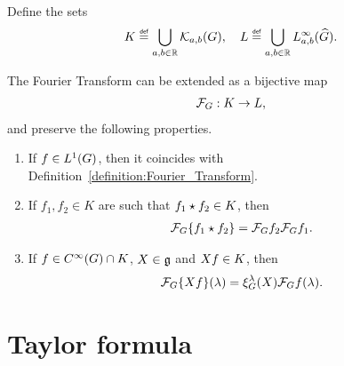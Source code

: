 \begin{proposition}
    Define the sets
    \begin{align*}
        K \defeq \bigcup_{a, b \in \R} \KernelsSobolev{a}{b}, \quad
        L \defeq \bigcup_{a, b \in \R} \LebesgueDual[a, b]{\infty}{\Group}.
    \end{align*}

    The Fourier Transform can be extended as a bijective map
    \begin{align*}
        \mathcal{F}_{G} : K \to L,
    \end{align*}
    and preserve the following properties.
    \begin{enumerate}
        \item If $f \in {L^{1} (G)}$, then it coincides with Definition~\ref{definition:Fourier_Transform}.
        \item If $f_1, f_2 \in K$ are such that $f_1 \star f_2 \in K$, then
            \begin{align*}
                \mathcal{F}_{G}\{f_1 \star f_2\} = \mathcal{F}_{G} f_2 \mathcal{F}_{G} f_1.
            \end{align*}
        \item If $f \in {C^\infty(G)} \cap K$, $X \in \mathfrak{g}$ and ${X} f \in K$, then
            \begin{align*}
                \mathcal{F}_{G}\{{X} f\}(\lambda) = \xi^{\lambda}_{G}(X) \mathcal{F}_{G} f(\lambda).
            \end{align*}
    \end{enumerate}
\end{proposition}

\section{Taylor formula}

